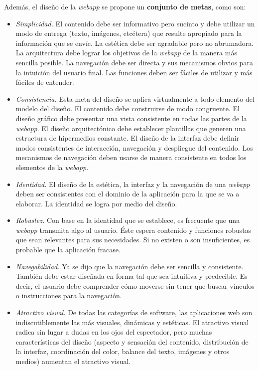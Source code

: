 		Además, el diseño de la \textit{webapp} se propone un \textbf{conjunto de metas}, como son:
		\begin{itemize}
			\item \textit{Simplicidad.} El contenido debe ser informativo pero sucinto y debe utilizar un modo de entrega (texto, imágenes, etcétera) que resulte apropiado para la información que se envíe. La estética debe ser agradable pero no abrumadora. La arquitectura debe lograr los objetivos de la \textit{webapp} de la manera más sencilla posible. La navegación debe ser directa y sus mecanismos obvios para la intuición del usuario final. Las funciones deben ser fáciles de utilizar y más fáciles de entender.
			\item \textit{Consistencia.} Esta meta del diseño se aplica virtualmente a todo elemento del modelo del diseño. El contenido debe construirse de modo congruente. El diseño gráfico debe presentar una vista consistente en todas las partes de la \textit{webapp}. El diseño arquitectónico debe establecer plantillas que generen una estructura de hipermedios constante. El diseño de la interfaz debe definir modos consistentes de interacción, navegación y despliegue del contenido. Los mecanismos de navegación deben usarse de manera consistente en todos los elementos de la \textit{webapp}.
			\item \textit{Identidad.} El diseño de la estética, la interfaz y la navegación de una \textit{webapp} deben ser consistentes con el dominio de la aplicación para la que se va a elaborar. La identidad se logra por medio del diseño.
			\item \textit{Robustez.} Con base en la identidad que se establece, es frecuente que una \textit{webapp} transmita algo al usuario. Éste espera contenido y funciones robustas que sean relevantes para sus necesidades. Si no existen o son insuficientes, es probable que la aplicación fracase.
			\item \textit{Navegabilidad.} Ya se dijo que la navegación debe ser sencilla y consistente. También debe estar diseñada en forma tal que sea intuitiva y predecible. Es decir, el usuario debe comprender cómo moverse sin tener que buscar vínculos o instrucciones para la navegación.
			\item \textit{Atractivo visual.} De todas las categorías de software, las aplicaciones web son indiscutiblemente las más visuales, dinámicas y estéticas. El atractivo visual radica sin lugar a dudas en los ojos del espectador, pero muchas características del diseño (aspecto y sensación del contenido, distribución de la interfaz, coordinación del color, balance del texto, imágenes y otros medios) aumentan el atractivo visual.
		\end{itemize}
		
